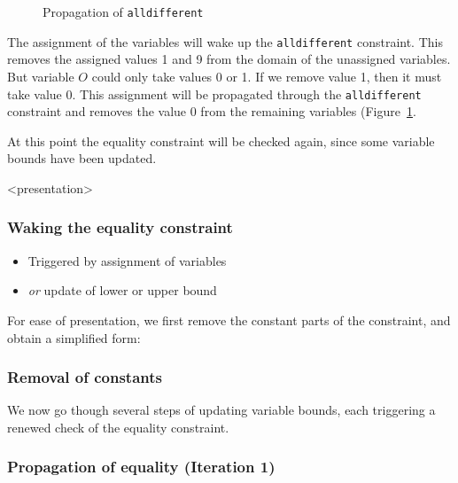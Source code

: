 \begin{figure}[ht]
\caption{\label{sendmore:alldifferentprop1}Propagation of \texttt{alldifferent}}
\begin{center}

\end{center}
\end{figure}


The assignment of the variables will wake up the \texttt{alldifferent} constraint. This removes the assigned values 1 and 9 from the domain of the unassigned variables. But variable $O$ could only take values 0 or 1. If we remove value 1, then it must take value 0. This assignment will be propagated through the \texttt{alldifferent} constraint and removes the value 0 from the remaining variables (Figure~\ref{sendmore:alldifferentprop1}.

At this point the equality constraint will be checked again, since some variable bounds have been updated.

\begin{frame}<presentation>
\frametitle{Waking the equality constraint}
\begin{itemize}
\item Triggered by assignment of variables
\item {\em or} update of lower or upper bound 
\end{itemize}
\end{frame}

For ease of presentation, we first remove the constant parts of the constraint, and obtain a simplified form:
\begin{frame}
\frametitle{Removal of constants}
\end{frame}

We now go though several steps of updating variable bounds, each triggering a renewed check of the equality constraint.

\begin{frame}
\frametitle{Propagation of equality (Iteration 1)}
\end{frame}

